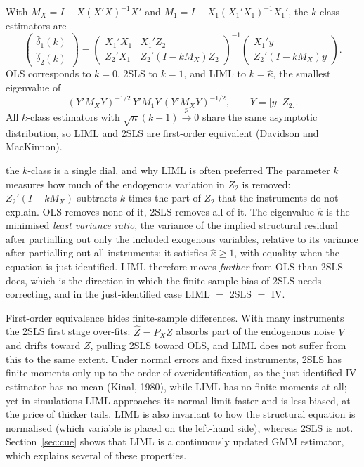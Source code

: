\documentclass[11pt,a4paper]{article}
\newcommand{\cp}{\xrightarrow{\;p\;}}
\newcommand{\dhat}{\hat\delta}
\begin{document}
With $M_X=I-X(X'X)^{-1}X'$ and $M_1=I-X_1(X_1'X_1)^{-1}X_1'$, the $k$-class estimators are
\[
\begin{pmatrix}\dhat_1(k)\\[2pt]\dhat_2(k)\end{pmatrix}=\begin{pmatrix}X_1'X_1&X_1'Z_2\\[2pt]Z_2'X_1&Z_2'(I-kM_X)Z_2\end{pmatrix}^{-1}\begin{pmatrix}X_1'y\\[2pt]Z_2'(I-kM_X)y\end{pmatrix}.
\]
OLS corresponds to $k=0$, 2SLS to $k=1$, and LIML to $k=\hat\kappa$, the smallest eigenvalue of
\[
(Y'M_XY)^{-1/2}\,Y'M_1Y\,(Y'M_XY)^{-1/2},\qquad Y=\big[y\;\; Z_2\big].
\]
All $k$-class estimators with $\sqrt n(k-1)\cp0$ share the same asymptotic distribution, so LIML and 2SLS are first-order equivalent (Davidson and MacKinnon).

\begin{whybox}{the $k$-class is a single dial, and why LIML is often preferred}
The parameter $k$ measures how much of the endogenous variation in $Z_2$ is removed: $Z_2'(I-kM_X)$ subtracts $k$ times the part of $Z_2$ that the instruments do not explain. OLS removes none of it, 2SLS removes all of it. The eigenvalue $\hat\kappa$ is the minimised \emph{least variance ratio}, the variance of the implied structural residual after partialling out only the included exogenous variables, relative to its variance after partialling out all instruments; it satisfies $\hat\kappa\geq1$, with equality when the equation is just identified. LIML therefore moves \emph{further} from OLS than 2SLS does, which is the direction in which the finite-sample bias of 2SLS needs correcting, and in the just-identified case LIML $=$ 2SLS $=$ IV.

First-order equivalence hides finite-sample differences. With many instruments the 2SLS first stage over-fits: $\hat Z=P_XZ$ absorbs part of the endogenous noise $V$ and drifts toward $Z$, pulling 2SLS toward OLS, and LIML does not suffer from this to the same extent. Under normal errors and fixed instruments, 2SLS has finite moments only up to the order of overidentification, so the just-identified IV estimator has no mean (Kinal, 1980), while LIML has no finite moments at all; yet in simulations LIML approaches its normal limit faster and is less biased, at the price of thicker tails. LIML is also invariant to how the structural equation is normalised (which variable is placed on the left-hand side), whereas 2SLS is not. Section~\ref{sec:cue} shows that LIML is a continuously updated GMM estimator, which explains several of these properties.
\end{whybox}
\end{document}
